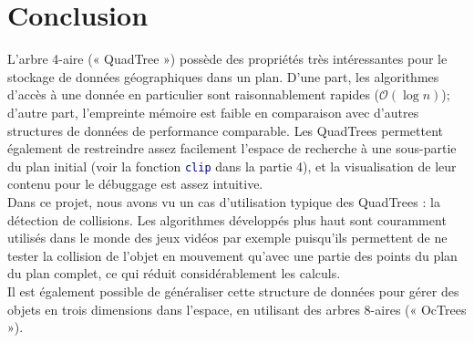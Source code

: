 \documentclass[11pt]{scrartcl}
\newcommand{\funname}[1]{\texttt{\textcolor{darkblue}{#1}}}
\begin{document}
\section*{Conclusion}
L'arbre 4-aire (« QuadTree ») possède des propriétés très intéressantes pour le stockage de données géographiques dans un plan. D'une part, les algorithmes d'accès à une donnée en particulier sont raisonnablement rapides ($\mathcal{O}(\log{}n)$); d'autre part, l'empreinte mémoire est faible en comparaison avec d'autres structures de données de performance comparable. Les QuadTrees permettent également de restreindre assez facilement l'espace de recherche à une sous-partie du plan initial (voir la fonction \funname{clip} dans la partie 4), et la visualisation de leur contenu pour le débuggage est assez intuitive.
\\
Dans ce projet, nous avons vu un cas d'utilisation typique des QuadTrees : la détection de collisions. Les algorithmes développés plus haut sont couramment utilisés dans le monde des jeux vidéos par exemple puisqu'ils permettent de ne tester la collision de l'objet en mouvement qu'avec une partie des points du plan du plan complet, ce qui réduit considérablement les calculs.
\\
Il est également possible de généraliser cette structure de données pour gérer des objets en trois dimensions dans l'espace, en utilisant des arbres 8-aires (« OcTrees »).
\end{document}
